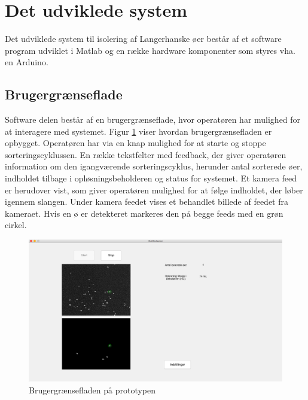 \section{Det udviklede system}
Det udviklede system til isolering af Langerhanske øer består af et software program udviklet i Matlab og en række hardware komponenter som styres vha. en Arduino.


 
\subsection{Brugergrænseflade}
Software delen består af en brugergrænseflade, hvor operatøren har mulighed for at interagere med systemet. Figur \ref{fig:finalgui} viser hvordan brugergrænsefladen er opbygget. Operatøren har via en knap mulighed for at starte og stoppe sorteringscyklussen. En række tekstfelter med feedback, der giver operatøren information om den igangværende sorteringscyklus, herunder antal sorterede øer, indholdet tilbage i opløsningsbeholderen og status for systemet. Et kamera feed er herudover vist, som giver operatøren mulighed for at følge indholdet, der løber igennem slangen. Under kamera feedet vises et behandlet billede af feedet fra kameraet. Hvis en ø er detekteret markeres den på begge feeds med en grøn cirkel.

 \begin{figure}[H]
	\centering
	\includegraphics[width=1\textwidth]{billeder/gui_main.png}
	\caption{Brugergrænsefladen på prototypen}
	\label{fig:finalgui}
\end{figure}